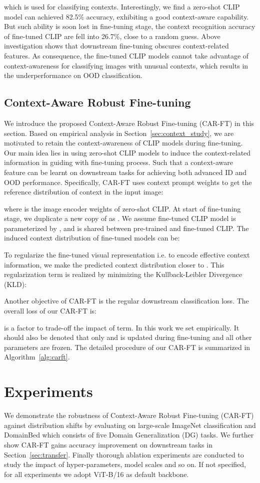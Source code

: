 \documentclass[pdflatex,sn-basic,iicol]{sn-jnl}
\theoremstyle{thmstyleone}\newtheorem{theorem}{Theorem}\newtheorem{proposition}[theorem]{Proposition}
\theoremstyle{thmstyletwo}\newtheorem{example}{Example}\newtheorem{remark}{Remark}
\theoremstyle{thmstylethree}\newtheorem{definition}{Definition}
\begin{document}
which is used for classifying contexts. Interestingly, we find a zero-shot CLIP model can achieved 82.5\% accuracy, exhibiting a good context-aware capability. But such ability is soon lost in fine-tuning stage, the context recognition accuracy of fine-tuned CLIP are fell into 26.7\%, close to a random guess. Above investigation shows that downstream fine-tuning obscures context-related features. As consequence, the fine-tuned CLIP models cannot take advantage of context-awareness for classifying images with unusual contexts, which results in the underperformance on OOD classification. 

\subsection{Context-Aware Robust Fine-tuning}
We introduce the proposed Context-Aware Robust Fine-tuning (CAR-FT) in this section. Based on empirical analysis in Section~\ref{sec:context_study}, we are motivated to retain the context-awareness of CLIP models during fine-tuning. Our main idea lies in using zero-shot CLIP models to induce the context-related information in guiding with fine-tuning process. Such that a context-aware feature can be learnt on downstream tasks for achieving both advanced ID and OOD performance. Specifically, CAR-FT uses context prompt weights  to get the reference
distribution of context in the input image:

where  is the image encoder weights of zero-shot CLIP. At start of fine-tuning stage, we duplicate a new copy of  as . We assume fine-tuned CLIP model is parameterized by , and  is shared between pre-trained and fine-tuned CLIP. The induced context distribution of fine-tuned models can be:

To regularize the fine-tuned visual representation i.e.  to encode effective context information, we make the predicted context distribution  closer to . This regularization term is realized by minimizing the Kullback-Leibler Divergence (KLD):

Another objective of CAR-FT is the regular downstream classification loss. The overall loss of our CAR-FT is:

 is a factor to trade-off the impact of  term. In this work we set  empirically. It should also be denoted that only  and  is updated during fine-tuning and all other parameters are frozen. The 
detailed procedure of our CAR-FT is summarized in Algorithm~\ref{alg:carft}.

\section{Experiments}
We demonstrate the robustness of Context-Aware Robust Fine-tuning (CAR-FT) against distribution shifts by evaluating on large-scale ImageNet classification and DomainBed which consists of five Domain Generalization (DG) tasks. We further show CAR-FT gains accuracy improvement on downstream tasks in Section~\ref{sec:transfer}. Finally thorough ablation experiments are conducted to study the impact of hyper-parameters, model scales and so on. If not specified, for all experiments we adopt ViT-B/16 as default backbone. 
\end{document}
